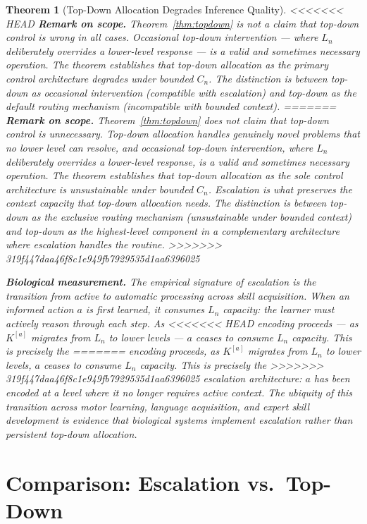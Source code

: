 \documentclass[11pt]{article}
\newtheorem{theorem}{Theorem}
\theoremstyle{definition}
\begin{document}
\begin{theorem}[Top-Down Allocation Degrades Inference Quality]
<<<<<<< HEAD
\textbf{Remark on scope.} Theorem~\ref{thm:topdown} is not a claim
that top-down control is wrong in all cases. Occasional top-down
intervention --- where $L_n$ deliberately overrides a lower-level
response --- is a valid and sometimes necessary operation. The theorem
establishes that top-down allocation as the \emph{primary} control
architecture degrades under bounded $C_n$. The distinction is between
top-down as occasional intervention (compatible with escalation) and
top-down as the default routing mechanism (incompatible with bounded
context).
=======
\textbf{Remark on scope.} Theorem~\ref{thm:topdown} does not claim
that top-down control is unnecessary. Top-down allocation handles
genuinely novel problems that no lower level can resolve, and
occasional top-down intervention, where $L_n$ deliberately overrides a
lower-level response, is a valid and sometimes necessary operation. The
theorem establishes that top-down allocation as the \emph{sole} control
architecture is unsustainable under bounded $C_n$. Escalation is what
preserves the context capacity that top-down allocation needs. The
distinction is between top-down as the exclusive routing mechanism
(unsustainable under bounded context) and top-down as the
highest-level component in a complementary architecture where
escalation handles the routine.
>>>>>>> 319f447daa46f8c1e949fb7929535d1aa6396025

\textbf{Biological measurement.} The empirical signature of escalation
is the transition from active to automatic processing across skill
acquisition. When an informed action $a$ is first learned, it consumes
$L_n$ capacity: the learner must actively reason through each step. As
<<<<<<< HEAD
encoding proceeds --- as $K^{[a]}$ migrates from $L_n$ to lower levels
--- $a$ ceases to consume $L_n$ capacity. This is precisely the
=======
encoding proceeds, as $K^{[a]}$ migrates from $L_n$ to lower levels,
$a$ ceases to consume $L_n$ capacity. This is precisely the
>>>>>>> 319f447daa46f8c1e949fb7929535d1aa6396025
escalation architecture: $a$ has been encoded at a level where it no
longer requires active context. The ubiquity of this transition across
motor learning, language acquisition, and expert skill development
\cite{Kahneman2011} is evidence that biological systems implement
escalation rather than persistent top-down allocation.

\section{Comparison: Escalation vs.\ Top-Down}
\label{sec:comparison}


\end{theorem}
\end{document}
